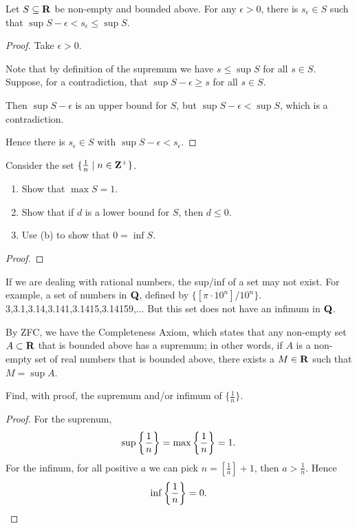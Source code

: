 \begin{proposition}
Let $S \subseteq \mathbf R$ be non-empty and bounded above. For any $\epsilon > 0$, there is $s_\epsilon \in S$ such that $\sup S-\epsilon < s_\epsilon \le \sup S$.
\end{proposition}
\begin{proof}
Take $\epsilon > 0$.

Note that by definition of the supremum we have $s \le \sup S$ for all $s \in S$. Suppose, for a contradiction, that $\sup S-\epsilon \ge s$ for all $s \in S$.

Then $\sup S-\epsilon$ is an upper bound for $S$, but $\sup S-\epsilon < \sup S$, which is a contradiction.

Hence there is $s_\epsilon \in S$ with $\sup S-\epsilon<s_\epsilon$.
\end{proof}
\pagebreak

\begin{prbm}
Consider the set $\{\frac{1}{n} \mid n\in\mathbf Z^{+}\}$.
\begin{enumerate}[label=(\alph*)]
\item Show that $\max S = 1$.
\item Show that if $d$ is a lower bound for $S$, then $d \le 0$.
\item Use (b) to show that $0 = \inf S$.
\end{enumerate}
\end{prbm}

\begin{proof}

\end{proof}

If we are dealing with rational numbers, the sup/inf of a set may not exist. For example, a set of numbers in $\mathbf Q$, defined by $\{[\pi\cdot10^n]/10^n\}$.
3,3.1,3.14,3.141,3.1415,3.14159,...
But this set does not have an infimum in $\mathbf Q$.

By ZFC, we have the Completeness Axiom, which states that any non-empty set $A \subset \mathbf R$ that is bounded above has a supremum; in other words, if $A$ is a non-empty set of real numbers that is bounded above, there exists a $M \in \mathbf R$ such that $M = \sup A$.




\begin{prbm}
Find, with proof, the supremum and/or infimum of $\{\frac{1}{n}\}$.
\end{prbm}

\begin{proof}
For the suprenum,
\[ \sup\left\{\frac{1}{n}\right\} = \max\left\{\frac{1}{n}\right\} = 1. \]
For the infinum, for all positive $a$ we can pick $n=[\frac{1}{a}]+1$, then $a>\frac{1}{n}$. Hence 
\[ \inf\left\{\frac{1}{n}\right\}=0. \]
\end{proof}

